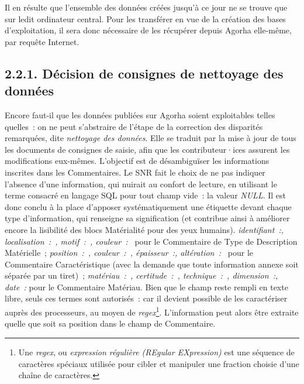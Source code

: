 \documentclass[a4paper,12pt, twoside]{book}
\begin{document}
Il en résulte que l’ensemble des données créées jusqu’à ce jour ne se trouve que sur ledit ordinateur central. Pour les transférer en vue de la création des bases d’exploitation, il sera donc nécessaire de les récupérer depuis Agorha elle-même, par requête Internet.

\subsection*{2.2.1. Décision de consignes de nettoyage des données}

Encore faut-il que les données publiées sur Agorha soient exploitables telles quelles~: on ne peut s’abstraire de l’étape de la correction des disparités remarquées, dite \textit{nettoyage des données}. Elle se traduit par la mise à jour de tous les documents de consignes de saisie, afin que les contributeur·ices assurent les modifications eux-mêmes. L’objectif est de désambiguïser les informations inscrites dans les \textsf{Commentaires}. Le SNR fait le choix de ne pas indiquer l’absence d’une information, qui nuirait au confort de lecture, en utilisant le terme consacré en langage SQL pour tout champ vide~: la valeur \textit{\textsf{NULL}}. Il est donc conclu à la place d’apposer systématiquement une étiquette devant chaque type d’information, qui renseigne sa signification (et contribue ainsi à améliorer encore la lisibilité des blocs \textsf{Matérialité} pour des yeux humains). \textit{\textsf{identifiant~:, localisation~:~, motif~:~, couleur~:~}} pour le \textsf{Commentaire de Type de Description Matérielle}~; \textit{position~:~, couleur~:~, épaisseur~:, altération~:~} pour le \textsf{Commentaire Caractéristique} (avec la demande que toute information annexe soit séparée par un tiret)~; \textit{\textsf{matériau~:~, certitude~:~, technique~:~, dimension~:, date~:}} pour le \textsf{Commentaire Matériau}. Bien que le champ reste rempli en texte libre, seuls ces termes sont autorisés~: car il devient possible de les caractériser auprès des processeurs, au moyen de \textit{regex}\footnote{Une \emph{regex}, ou \emph{expression régulière (REgular EXpression)} est une séquence de caractères spéciaux utilisée pour cibler et manipuler une fraction choisie d’une chaîne de caractères.}. L’information peut alors être extraite quelle que soit sa position dans le champ de \textsf{Commentaire}.
\end{document}
